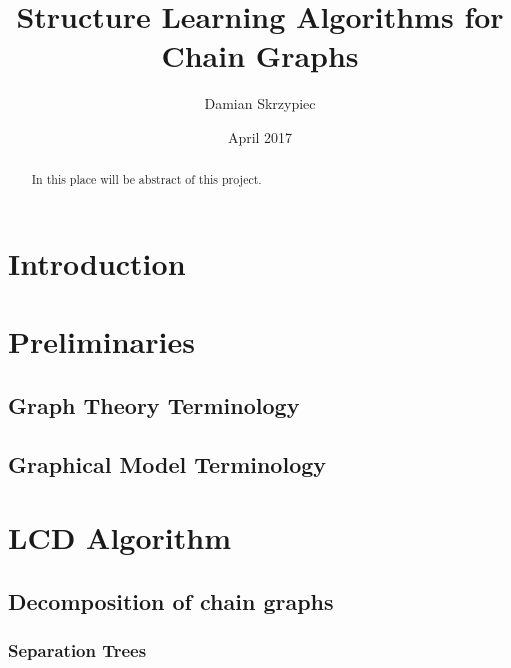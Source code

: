 \documentclass{pracamgr}
\author{Damian Skrzypiec}
\title{Structure Learning Algorithms for Chain Graphs}
\date{April 2017}
\theoremstyle{definition}
\begin{document}
\maketitle

\begin{abstract}
  In this place will be abstract of this project.
\end{abstract}

\tableofcontents
\listoffigures
\listofalgorithms
{}

\chapter{Introduction}




\chapter{Preliminaries}\label{r:prelim}

	\section{Graph Theory Terminology}\label{r:defGraph}
		
		
	\section{Graphical Model Terminology}\label{r:defGraphModel}
		


\chapter{LCD Algorithm} \label{chap:LCDAlg}

	

	\section{Decomposition of chain graphs}
		
		
		\subsection{Separation Trees} \label{subsec:SepTrees}
			
			
\end{document}
